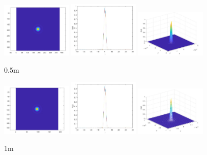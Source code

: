\documentclass[12pt,a4paper,UTF8]{ctexart}
\begin{document}
\begin{figure}[htbp]
	\centering
	\includegraphics[width=0.3\textwidth]{img//0.54.jpg}
	\includegraphics[width=0.3\textwidth]{img//0.55.jpg}
	\includegraphics[width=0.3\textwidth]{img//0.56.jpg}
	\caption{0.5m}
\end{figure}

\begin{figure}[htbp]
	\centering
	\includegraphics[width=0.3\textwidth]{img//1.4.jpg}
	\includegraphics[width=0.3\textwidth]{img//1.5.jpg}
	\includegraphics[width=0.3\textwidth]{img//1.6.jpg}
	\caption{1m}
\end{figure}
\end{document}
